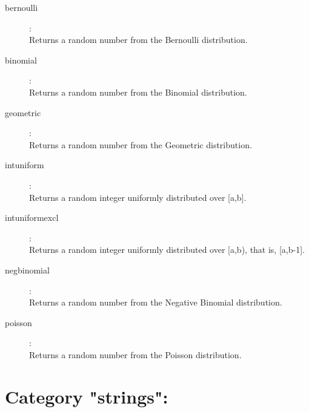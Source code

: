 \begin{description}
\item[bernoulli]:  \\
    Returns a random number from the Bernoulli distribution.

\item[binomial]:  \\
    Returns a random number from the Binomial distribution.

\item[geometric]:  \\
    Returns a random number from the Geometric distribution.

\item[intuniform]:  \\
    Returns a random integer uniformly distributed over [a,b].

\item[intuniformexcl]:  \\
    Returns a random integer uniformly distributed over [a,b), that is,
    [a,b-1].

\item[negbinomial]:  \\
    Returns a random number from the Negative Binomial distribution.

\item[poisson]:  \\
    Returns a random number from the Poisson distribution.


\end{description}

\section{Category "strings":}
\label{sec:ned-functions:category-strings}

